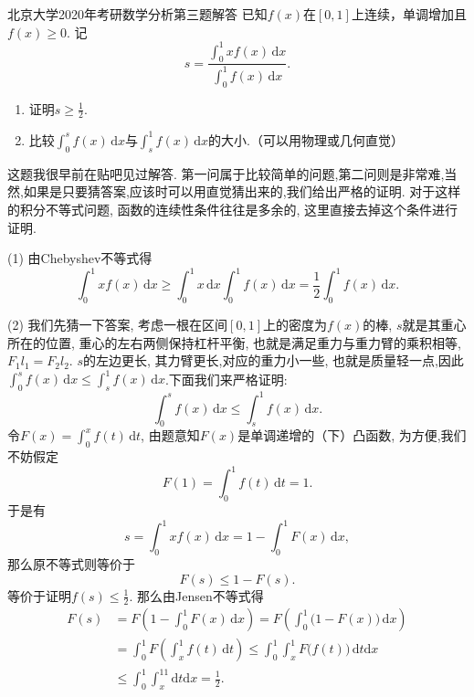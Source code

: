 \documentclass[UTF8,no-math,12pt,openany,table,dvipsnames,svgnames]{book}
\newcommand{\hei}{\CJKfamily{hei}}
\newenvironment{Proof}{\par\indent{\hei 证明}\hspace{1em}}{\par}
\renewcommand{\le}{\leqslant}
\renewcommand{\ge}{\geqslant}
\begin{document}
\begin{MYBOX}[colbacktitle=blue]{北京大学2020年考研数学分析第三题解答}
已知$f(x)$在$[0,1]$上连续，单调增加且$f(x)\ge0$. 记
\[s=\frac{\int_0^1xf(x)\,\mathrm dx}{\int_0^1f(x)\,\mathrm dx}.\]
\begin{enumerate}[(1)]
\item 证明$s\ge\frac12$.
\item 比较$\int_0^sf(x)\,\mathrm dx$与$\int_s^1f(x)\,\mathrm dx$的大小.（可以用物理或几何直觉）
\end{enumerate}
\tcblower
\begin{Proof}
这题我很早前在贴吧见过解答. 第一问属于比较简单的问题,第二问则是非常难,当然,如果是只要猜答案,应该时可以用直觉猜出来的,我们给出严格的证明. 对于这样的积分不等式问题, 函数的连续性条件往往是多余的, 这里直接去掉这个条件进行证明.

(1) 由Chebyshev不等式得
\[\int_0^1xf(x)\,\mathrm dx\ge\int_0^1x\,\mathrm dx\int_0^1f(x)\,\mathrm dx=\frac12\int_0^1f(x)\,\mathrm dx.\]

(2) 我们先猜一下答案, 考虑一根在区间$[0,1]$上的密度为$f(x)$的棒, $s$就是其重心所在的位置, 重心的左右两侧保持杠杆平衡, 也就是满足重力与重力臂的乘积相等, $F_1l_1=F_2l_2$. $s$的左边更长, 其力臂更长,对应的重力小一些, 也就是质量轻一点,因此$\int_0^sf(x)\,\mathrm dx\le\int_s^1f(x)\,\mathrm dx$.下面我们来严格证明:
\[\int_0^sf(x)\,\mathrm dx\le\int_s^1f(x)\,\mathrm dx.\]
令$F(x)=\int_0^xf(t)\,\mathrm dt$, 由题意知$F(x)$是单调递增的（下）凸函数, 为方便,我们不妨假定
\[F(1)=\int_0^1f(t)\,\mathrm dt=1.\]
于是有
\[s=\int_0^1xf(x)\,\mathrm dx=1-\int_0^1F(x)\,\mathrm dx,\]
那么原不等式则等价于
\[F(s)\le 1-F(s).\]
等价于证明$f(s)\le\frac12$. 那么由Jensen不等式得
\begin{align*}
F(s)&=F\left(1-\int_0^1F(x)\,\mathrm dx\right)=F\left(\int_0^1\big(1-F(x)\big)\,\mathrm dx\right)\\
&=\int_0^1F\left(\int_x^1f(t)\,\mathrm dt\right)\le\int_0^1\int_x^1F\big(f(t)\big)\,\mathrm dt\mathrm dx\\
&\le\int_0^1\int_x^11\mathrm dt\mathrm dx=\frac12.
\end{align*}

\end{Proof}
\end{MYBOX}
\end{document}
